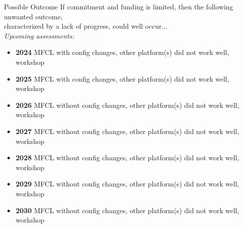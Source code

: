 \documentclass[aspectratio=169]{beamer}
\begin{document}

\begin{frame}[plain]
\end{frame}


\begin{frame}{Possible Outcome}\small
  If commitment and funding is limited, then the following unwanted outcome,\\
  characterized by a lack of progress, could well occur...\\[2ex]
  \textit{Upcoming assessments:}
  \begin{itemize}
    \item[] {\bf 2024} MFCL with config changes, other platform(s) did not work
    well, workshop
    \item[] {\bf 2025} MFCL with config changes, other platform(s) did not work
    well, workshop
    \item[] {\bf 2026} MFCL without config changes, other platform(s) did not
    work well, workshop
    \item[] {\bf 2027} MFCL without config changes, other platform(s) did not
    work well, workshop
    \item[] {\bf 2028} MFCL without config changes, other platform(s) did not
    work well, workshop
    \item[] {\bf 2029} MFCL without config changes, other platform(s) did not
    work well, workshop
    \item[] {\bf 2030} MFCL without config changes, other platform(s) did not
    work well, workshop
  \end{itemize}
\end{frame}

\end{document}
